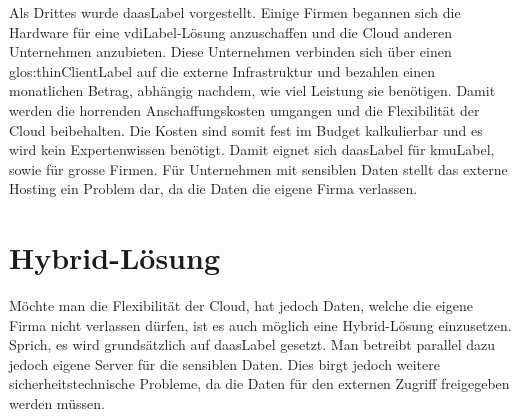 Als Drittes wurde \Gls{daasLabel} vorgestellt. Einige Firmen begannen sich die Hardware für eine \Gls{vdiLabel}-Lösung anzuschaffen und die Cloud anderen Unternehmen anzubieten. Diese Unternehmen verbinden sich über einen \Gls{glos:thinClientLabel} auf die externe Infrastruktur und bezahlen einen monatlichen Betrag, abhängig nachdem, wie viel Leistung sie benötigen. Damit werden die horrenden Anschaffungskosten umgangen und die Flexibilität der Cloud beibehalten. Die Kosten sind somit fest im Budget kalkulierbar und es wird kein Expertenwissen benötigt. Damit eignet sich \Gls{daasLabel} für \Gls{kmuLabel}, sowie für grosse Firmen. Für Unternehmen mit sensiblen Daten stellt das externe Hosting ein Problem dar, da die Daten die eigene Firma verlassen.

\section{Hybrid-Lösung}
Möchte man die Flexibilität der Cloud, hat jedoch Daten, welche die eigene Firma nicht verlassen dürfen, ist es auch möglich eine Hybrid-Lösung einzusetzen. Sprich, es wird grundsätzlich auf \Gls{daasLabel} gesetzt. Man betreibt parallel dazu jedoch eigene Server für die sensiblen Daten. Dies birgt jedoch weitere sicherheitstechnische Probleme, da die Daten für den externen Zugriff freigegeben werden müssen.



\glsaddall
